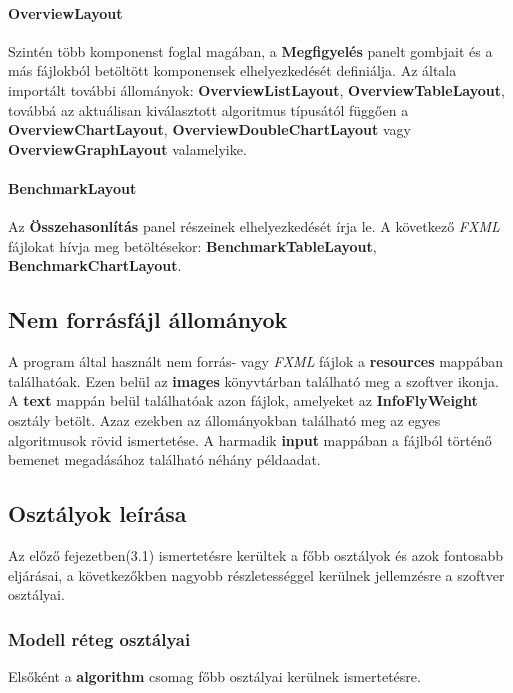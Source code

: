 \documentclass{elteikthesis}
\begin{document}
\paragraph{OverviewLayout}
Szintén több komponenst foglal magában, a \textbf{Megfigyelés} panelt gombjait és a más fájlokból betöltött komponensek elhelyezkedését definiálja. Az általa importált további állományok: \textbf{OverviewListLayout}, \textbf{OverviewTableLayout}, továbbá az aktuálisan kiválasztott algoritmus típusától függően a \textbf{OverviewChartLayout}, \textbf{OverviewDoubleChartLayout} vagy \textbf{OverviewGraphLayout} valamelyike.
\paragraph{BenchmarkLayout}
Az \textbf{Összehasonlítás} panel részeinek elhelyezkedését írja le. A következő \emph{FXML} fájlokat hívja meg betöltésekor: \textbf{BenchmarkTableLayout}, \textbf{BenchmarkChartLayout}.

\subsection{Nem forrásfájl állományok}
A program által használt nem forrás- vagy \emph{FXML} fájlok a \textbf{resources} mappában találhatóak. Ezen belül az \textbf{images} könyvtárban található meg a szoftver ikonja. A \textbf{text} mappán belül találhatóak azon fájlok, amelyeket az \textbf{InfoFlyWeight} osztály betölt. Azaz ezekben az állományokban található meg az egyes algoritmusok rövid ismertetése. A harmadik \textbf{input} mappában a fájlból történő bemenet megadásához található néhány példaadat.

\subsection{Osztályok leírása}
Az előző fejezetben(3.1) ismertetésre kerültek a főbb osztályok és azok fontosabb eljárásai, a következőkben nagyobb részletességgel kerülnek jellemzésre a szoftver osztályai.
\subsubsection{Modell réteg osztályai}
Elsőként a \textbf{algorithm} csomag főbb osztályai kerülnek ismertetésre.
\end{document}
